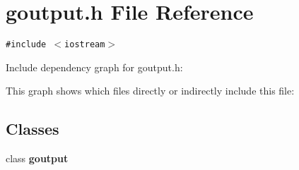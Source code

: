 \section{goutput.h File Reference}
\label{goutput_8h}
{\tt \#include $<$iostream$>$}\par


Include dependency graph for goutput.h:

This graph shows which files directly or indirectly include this file:\subsection*{Classes}
\begin{CompactItemize}
\item 
class \bf{goutput}
\end{CompactItemize}
